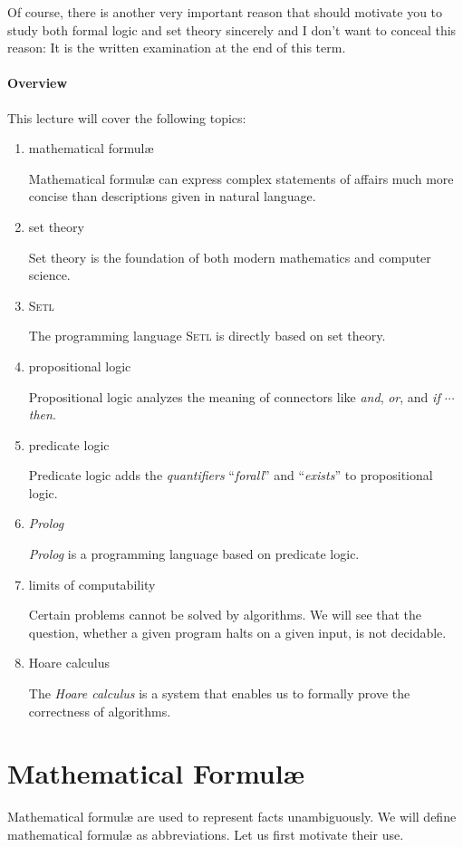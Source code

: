 Of course, there is another very important reason that should motivate you to study both formal
logic and set theory sincerely and I don't want to conceal this reason:  It is the written
examination at the end of this term.

\paragraph{Overview} 
This lecture will cover the following topics:
\begin{enumerate}
\item mathematical {formul\ae}

      Mathematical {formul\ae} can express complex statements of affairs
      much more concise than descriptions given in natural language.
\item set theory

      Set theory is the foundation of both modern mathematics and computer science.
\item \textsc{Setl}
  
      The programming language \textsc{Setl} is directly based on set theory.
\item propositional logic

      Propositional logic analyzes the meaning of connectors like \emph{and}, \emph{or}, 
      and \emph{if $\cdots$ then}.
\item predicate logic      

      Predicate logic adds the \emph{quantifiers} ``\emph{forall}'' and ``\emph{exists}''
      to propositional logic.
\item \textsl{Prolog}

      \textsl{Prolog} is a programming language based on predicate logic.
\item limits of computability

      Certain problems cannot be solved by algorithms.  We will see that the question,
      whether a given program halts on a given input, is not decidable.
\item Hoare calculus

      The \emph{Hoare calculus} is a system that enables us to formally prove the correctness
      of algorithms.
\end{enumerate}

\section{Mathematical {Formul\ae}}
Mathematical {formul\ae} are used to represent facts unambiguously.  We will define
mathematical {formul\ae} as abbreviations.  Let us first motivate their use.

